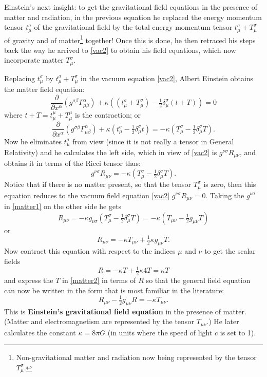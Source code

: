 \documentclass[12pt,reqno]{amsart}
\theoremstyle{definition}
\numberwithin{equation}{section}
\begin{document}
Einstein's next insight: to get the gravitational field equations in the presence of matter and radiation, in the previous equation he replaced the energy momentum tensor $t_\mu^\sigma$ of the gravitational field by the total energy momentum tensor $t_\mu^\sigma + T_\mu^\sigma$ of gravity and of matter\footnote{Non-gravitational matter and radiation now being represented by the tensor $T_{\mu}^\sigma$.} together!  Once this is done, he then retraced his steps back the way he arrived to \eqref{vac2} to obtain his field equations, which now incorporate matter $T_{\mu}^\sigma$. 

Replacing $t_\mu^\sigma$ by $t_\mu^\sigma + T_\mu^\sigma$ in the vacuum equation \eqref{vac2}, Albert Einstein obtains the matter field equation:
\begin{equation*}
\frac{\partial}{\partial x^\alpha}\left(g^{\sigma\beta} \Gamma_{\mu\beta}^\alpha\right) + \kappa\left( (t_\mu^\sigma + T_\mu^\sigma) - \tfrac12 \delta_\mu^\sigma (t + T)\right) = 0
\end{equation*}
where $t + T = t_\mu^\mu + T_\mu^\mu$ is the contraction; or
$$
\!\!\!\!\!\!\frac{\partial}{\partial x^\alpha}\left(g^{\sigma\beta} \Gamma_{\mu\beta}^\alpha\right) + \kappa\left( t_\mu^\sigma - \tfrac12 \delta_\mu^\sigma t \right)
= - \kappa \left(T_\mu^\sigma - \tfrac12 \delta_\mu^\sigma T \right).
$$
Now he eliminates  $t_\mu^\sigma$ from view (since it is not really a tensor in General Relativity) and he calculates the left side, which in view of \eqref{vac2} is $g^{\nu\sigma} R_{\mu\nu}$, and obtains it in terms of the Ricci tensor thus:
\begin{equation}\label{matter1}
g^{\nu\sigma} R_{\mu\nu} = - \kappa \left(T_\mu^\sigma - \tfrac12 \delta_\mu^\sigma T \right).
\end{equation}
Notice that if there is no matter present, so that the tensor $T_\mu^\sigma$ is zero, then this equation reduces to the vacuum field equation \eqref{vac2} $g^{\nu\sigma} R_{\mu\nu} = 0$. Taking the $g^{\nu\sigma}$ in \eqref{matter1} on the other side he gets
\[
R_{\mu\nu} = - \kappa g_{\nu\sigma} \left(T_\mu^\sigma - \tfrac12 \delta_\mu^\sigma T \right)
= - \kappa \left(T_{\mu\nu} - \tfrac12 g_{\mu\nu}T \right)
\]
or
\begin{equation}\label{matter2}
R_{\mu\nu} = 
- \kappa T_{\mu\nu} + \tfrac12 \kappa g_{\mu\nu}T.
\end{equation}
Now contract this equation with respect to the indices $\mu$ and $\nu$ to get the scalar fields
$$R = - \kappa T + \tfrac12 \kappa 4 T = \kappa T$$
and express the $T$ in \eqref{matter2} in terms of $R$ so that the general field equation can now be written in the form that is most familiar in the literature:
{\large\[
R_{\mu\nu} - \tfrac12 g_{\mu\nu} R = - \kappa T_{\mu\nu}.
\]}
This is {\bf Einstein's gravitational field equation} in the presence of matter. (Matter and electromagnetism are represented by the tensor $T_{\mu\nu}$.) He later calculates the constant $\kappa = 8\pi G$ (in units where the speed of light $c$ is set to 1).
\end{document}
